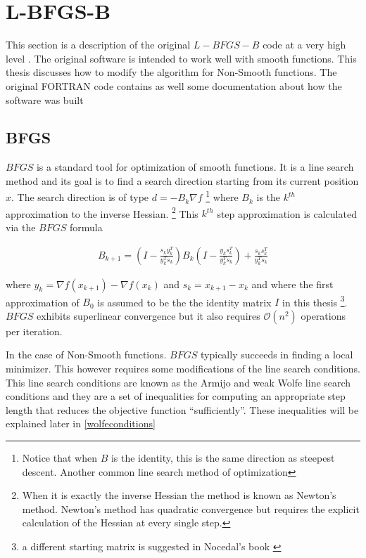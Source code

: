 \chapter{L-BFGS-B}
\label{ChapterConstraints} %

This section is a description of the original $L-BFGS-B$ code at a very high level \citep{lbfgsbsoftware}. The original software is intended to work well with smooth functions. This thesis discusses how to modify the algorithm for Non-Smooth functions. The original \textsc{FORTRAN} code contains as well some documentation \citep{codepaper} about how the software was built

\section{BFGS}

$BFGS$ is a standard tool for optimization of smooth functions.\citep{nocedal} It is a line search method and its goal is to find a search direction starting from its current position $x$. The search direction is of type $d = -B_k \nabla f$ \footnote{Notice that when $B$ is the identity, this is the same direction as steepest descent. Another common line search method of optimization} where $B_k$ is the $k^{th}$ approximation to the inverse Hessian. \footnote{When it is exactly the inverse Hessian the method is known as Newton's method. Newton's method has quadratic convergence but requires the explicit calculation of the Hessian at every single step.} This $k^{th}$ step approximation is calculated via the $BFGS$ formula

\begin{equation} \label{bfgsupdate}
  \begin{aligned}
    B_{k+1} = \left(I - \frac{s_ky_k^T}{y_k^Ts_k} \right) B_k \left( I - \frac{y_ks_k^T}{y_k^Ts_k} \right) + \frac{s_k s_k^T}{y_k^T s_k}
  \end{aligned}
\end{equation}

where $y_k = \nabla f(x_{k+1}) - \nabla f(x_k)$ and $s_k = x_{k+1} - x_k$ and where the first approximation of $B_0$ is assumed to be the the identity matrix $I$ in this thesis \footnote{a different starting matrix is suggested in Nocedal's book \citep{nocedal}}.  $BFGS$ exhibits superlinear convergence but it also requires $\mathcal{O}(n^2)$ operations per iteration. \citep{nocedal}

In the case of Non-Smooth functions. $BFGS$ typically succeeds in finding a local minimizer. This however requires some modifications of the line search conditions. This line search conditions are known as the Armijo and weak Wolfe line search conditions and they are a set of inequalities for computing an appropriate step length that reduces the objective function ``sufficiently''. These inequalities will be explained later in \ref{wolfeconditions}

